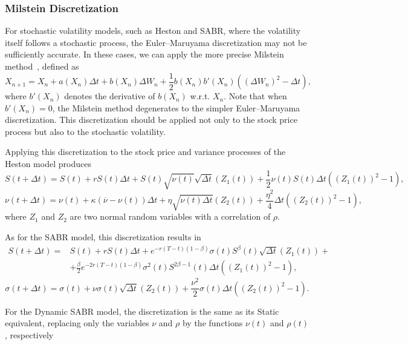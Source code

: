 \subsubsection{Milstein Discretization}
For stochastic volatility models, such as Heston and SABR, where the volatility itself follows a stochastic process, the Euler–Maruyama discretization may not be sufficiently accurate. In these cases, we can apply the more precise Milstein method~\citep{Milstein}, defined as
\begin{equation}
X_{n+1}=X_n+a(X_n)\Delta t+b(X_n)\Delta W_n+\frac{1}{2}b(X_n)b'(X_n)((\Delta W_n)^2-\Delta t),
\end{equation}
\noindent where $b'(X_n)$ denotes the derivative of $b(X_n)$ w.r.t. $X_n$. Note that when $b'(X_n)=0$, the Milstein method degenerates to the simpler Euler–Maruyama discretization. This discretization should be applied not only to the stock price process but also to the stochastic volatility.

Applying this discretization to the stock price and variance processes of the Heston model produces
\begin{equation}
S(t+\Delta t)=S(t)+rS(t)\Delta t+S(t)\sqrt{\nu(t)}\sqrt{\Delta t}(Z_1(t))+\frac{1}{2}\nu(t)S(t)\Delta t((Z_1(t))^2-1),
\end{equation}
\begin{equation}
\nu(t+\Delta t)=\nu(t)+\kappa(\overline{\nu}-\nu(t))\Delta t+\eta\sqrt{\nu(t)\Delta t}(Z_2(t))+\frac{\eta^2}{4}\Delta t((Z_2(t))^2-1),
\end{equation}
\noindent where $Z_1$ and $Z_2$ are two normal random variables with a correlation of $\rho$.


As for the SABR model, this discretization results in
\begin{equation}
\begin{split}
S(t+\Delta t)=&S(t)+rS(t)\Delta t+e^{-r(T-t)(1-\beta)}\sigma(t)S^\beta(t)\sqrt{\Delta t}(Z_1(t))+\\
&+\frac{\beta}{2}e^{-2r(T-t)(1-\beta)}\sigma^2(t)S^{2\beta-1}(t)\Delta t((Z_1(t))^2-1),
\end{split}
\end{equation}
\begin{equation}
\sigma(t+\Delta t)=\sigma(t)+\nu\sigma(t)\sqrt{\Delta t}(Z_2(t))+\frac{\nu^2}{2}\sigma(t)\Delta t((Z_2(t))^2-1).
\end{equation}

For the Dynamic SABR model, the discretization is the same as its Static equivalent, replacing only the variables $\nu$ and $\rho$ by the functions $\nu(t)$ and $\rho(t)$, respectively


